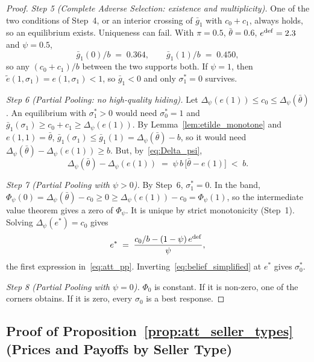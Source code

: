 \begin{proof}
\emph{Step 5 (Complete Adverse Selection: existence and multiplicity).} One of the two conditions of Step~4, or an interior crossing of $\bar g_1$ with $c_0+c_1$, always holds, so an equilibrium exists. Uniqueness can fail. With $\pi=0.5$, $\bar\theta=0.6$, $e^{\rm def}=2.3$ and $\psi=0.5$,
\begin{equation*}
    \bar g_1(0)/b\;=\;0.364,\qquad\bar g_1(1)/b\;=\;0.450,
\end{equation*}
so any $(c_0+c_1)/b$ between the two supports both. If $\psi=1$, then $\tilde e(1,\sigma_1)=e(1,\sigma_1)<1$, so $\bar g_1<0$ and only $\sigma_1^*=0$ survives.

\emph{Step 6 (Partial Pooling: no high-quality hiding).} Let $\Delta_\psi(e(1))\le c_0\le\Delta_\psi(\bar\theta)$. An equilibrium with $\sigma_1^*>0$ would need $\sigma_0^*=1$ and $\bar g_1(\sigma_1)\ge c_0+c_1\ge\Delta_\psi(e(1))$. By Lemma~\ref{lem:etilde_monotone} and $e(1,1)=\bar\theta$, $\bar g_1(\sigma_1)\le\bar g_1(1)=\Delta_\psi(\bar\theta)-b$, so it would need $\Delta_\psi(\bar\theta)-\Delta_\psi(e(1))\ge b$. But, by~\eqref{eq:Delta_psi},
\begin{equation*}
    \Delta_\psi(\bar\theta)-\Delta_\psi(e(1))\;=\;\psi\,b\,\big[\bar\theta-e(1)\big]\;<\;b.
\end{equation*}

\emph{Step 7 (Partial Pooling with $\psi>0$).} By Step~6, $\sigma_1^*=0$. In the band, $\Phi_\psi(0)=\Delta_\psi(\bar\theta)-c_0\ge0\ge\Delta_\psi(e(1))-c_0=\Phi_\psi(1)$, so the intermediate value theorem gives a zero of $\Phi_\psi$. It is unique by strict monotonicity (Step~1). Solving $\Delta_\psi(e^*)=c_0$ gives
\begin{equation*}
    e^*\;=\;\frac{c_0/b-(1-\psi)\,e^{\rm def}}{\psi},
\end{equation*}
the first expression in~\eqref{eq:att_pp}. Inverting~\eqref{eq:belief_simplified} at $e^*$ gives $\sigma_0^*$.

\emph{Step 8 (Partial Pooling with $\psi=0$).} $\Phi_0$ is constant. If it is non-zero, one of the corners obtains. If it is zero, every $\sigma_0$ is a best response.
\end{proof}

\subsection*{Proof of Proposition~\ref{prop:att_seller_types} (Prices and Payoffs by Seller Type)}


